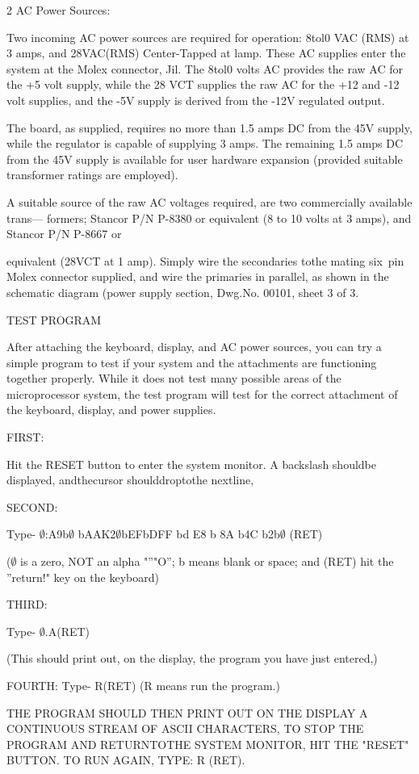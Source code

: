 \documentclass[letterpaper]{article}
\begin{document}
\begin{multicols}{2}
\noindent AC Power Sources:

Two incoming AC power sources are required for operation: 8tol0 VAC (RMS) at 3 amps, and 28VAC(RMS) Center-Tapped at lamp. These AC supplies enter the system at the Molex connector, Jil. The 8tol0 volts AC provides the raw AC for the +5 volt supply, while the 28 VCT supplies the raw AC for the +12 and -12 volt supplies, and the -5V supply is derived from the -12V regulated output.

The board, as supplied, requires no more than 1.5 amps DC from the 45V supply, while the regulator is capable of supplying 3 amps. The remaining 1.5 amps DC from the 45V supply is available for user hardware expansion (provided suitable transformer ratings are employed).

A suitable source of the raw AC voltages required, are two commercially available trans— formers; Stancor P/N P-8380 or equivalent (8 to 10 volts at 3 amps), and Stancor P/N P-8667 or

equivalent (28VCT at 1 amp). Simply wire the secondaries tothe mating six~pin Molex connector supplied, and wire the primaries in parallel, as shown in the schematic diagram (power supply section, Dwg.No. 00101, sheet 3 of 3.

\noindent TEST PROGRAM

After attaching the keyboard, display, and AC power sources, you can try a simple program to test if your system and the attachments are functioning together properly. While it does not test many possible areas of the microprocessor system, the test program will test for the correct attachment of the keyboard, display, and power supplies.

FIRST:

Hit the RESET button to enter the system monitor. A backslash shouldbe displayed, andthecursor shoulddroptothe nextline,

SECOND:

Type- $\emptyset$:A9b$\emptyset$ bAAK2$\emptyset$bEFbDFF bd E8 b 8A b4C b2b$\emptyset$ (RET)

($\emptyset$ is a zero, NOT an alpha "''"O''; b means blank or space; and (RET) hit the ''return!" key on the keyboard)

THIRD:

Type- $\emptyset$.A(RET)

(This should print out, on the display, the program you have just entered,)

FOURTH: Type- R(RET) (R means run the program.)

THE PROGRAM SHOULD THEN PRINT OUT ON THE DISPLAY A CONTINUOUS STREAM OF ASCII CHARACTERS, TO STOP THE PROGRAM AND RETURNTOTHE SYSTEM MONITOR, HIT THE "RESET" BUTTON. TO RUN AGAIN, TYPE: R (RET).
\end{multicols}
\end{document}

